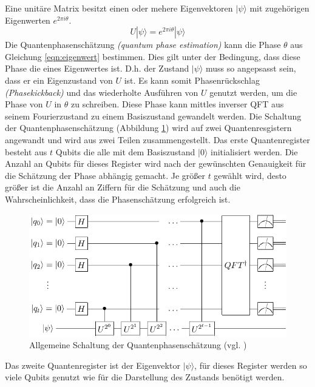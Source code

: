 Eine unit\"are Matrix besitzt einen oder mehere Eigenvektoren $|\psi\rangle$ mit zugeh\"origen Eigenwerten $e^{2\pi i \theta}$.
\begin{equation}
\label{eqn:eigenwert}
  U|\psi\rangle = e^{2\pi i \theta}|\psi\rangle
\end{equation}
Die Quantenphasensch\"atzung \textit{(quantum phase estimation)} kann die Phase $\theta$ aus Gleichung \ref{eqn:eigenwert} bestimmen. Dies gilt unter der Bedingung, dass diese Phase die eines Eigenwertes ist. D.h. der Zustand $|\psi\rangle$ muss so angepsasst sein, dass er ein Eigenzustand von $U$ ist. Es kann somit Phasenr\"uckschlag \textit{(Phasekickback)} und das wiederholte Ausf\"uhren von $U$ genutzt werden, um die Phase von $U$ in $\theta$ zu schreiben. Diese Phase kann mittles inverser QFT aus seinem Fourierzustand zu einem Basiszustand gewandelt werden. Die Schaltung der Quantenphasensch\"atzung (Abbildung \ref{fig:QPE}) wird auf zwei Quantenresgistern angewandt und wird aus zwei Teilen zusammengestellt. Das erste Quantenregister besteht aus $t$ Qubits die alle mit dem Basiszustand $|0\rangle$ initialisiert werden. Die Anzahl an Qubits f\"ur dieses Register wird nach der gew\"unschten Genauigkeit f\"ur die Sch\"atzung der Phase abh\"angig gemacht. Je gr\"o\ss er $t$ gew\"ahlt wird, desto gr\"o\ss er ist die Anzahl an Ziffern f\"ur die Sch\"atzung und auch die Wahrscheinlichkeit, dass die Phasensch\"atzung erfolgreich ist.
\begin{figure}[h]
  \centering
  \includegraphics[width=1\textwidth]{figures/QPE.pdf}
  \caption{Allgemeine Schaltung der Quantenphasensch\"atzung (vgl. \cite{nielsen_chuang_2010})}
  \label{fig:QPE}
\end{figure}
Das zweite Quantenregister ist der Eigenvektor $|\psi\rangle$, f\"ur dieses Register werden so viele Qubits genutzt wie f\"ur die Darstellung des Zustands ben\"otigt werden.\\\\

